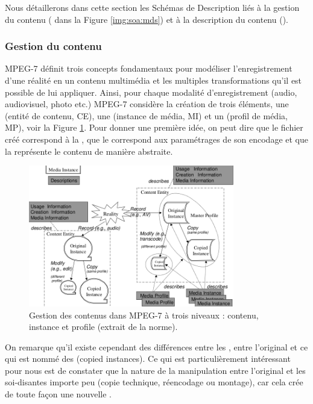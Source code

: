 Nous détaillerons dans cette section les Schémas de Description liés à la gestion du contenu ( dans la Figure \ref{img:soa:mds}) et à la description du contenu ().\\


\subsubsection{Gestion du contenu}
MPEG-7 définit trois concepts fondamentaux pour modéliser l'enregistrement d'une réalité en un contenu multimédia et les multiples transformations qu'il est possible de lui appliquer. 
Ainsi, pour chaque modalité d'enregistrement (audio, audiovisuel, photo etc.) MPEG-7 considère la création de trois éléments, une  (entité de contenu, CE), une  (instance de média, MI) et un  (profil de média, MP), voir la Figure \ref{img:soa:media}.
Pour donner une première idée, on peut dire que le fichier créé correspond à la , que le  correspond aux paramétrages de son encodage et que la  représente le contenu de manière abstraite.

\begin{figure}[ht!]
\centering
\includegraphics[width=0.8\textwidth]{images/MPEG-7-MediaManagement.png}
\caption{Gestion des contenus dans MPEG-7 à trois niveaux : contenu, instance et profile (extrait de la norme).}
\label{img:soa:media}
\end{figure}


On remarque qu'il existe cependant des différences entre les , entre l'original et ce qui est nommé des  (copied instances). 
Ce qui est particulièrement intéressant pour nous est de constater que la nature de la manipulation entre l'original et les soi-disantes  importe peu (copie technique, réencodage ou montage), car cela crée de toute façon une nouvelle . 

